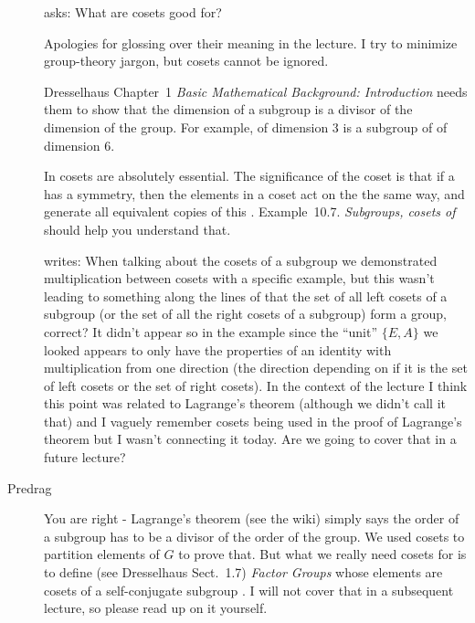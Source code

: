\begin{description}

  \item[\student]  asks:
    {What are cosets good for?}{
Apologies for glossing over their meaning in the lecture. I try to
minimize group-theory jargon, but cosets cannot be ignored.

Dresselhaus \etal{} 
Chapter~1 {\em Basic Mathematical Background: Introduction}
needs them to show that the dimension
of a subgroup is a divisor of the dimension of the group.
For example,  of dimension 3 is a subgroup
of  of dimension 6.

In
cosets are absolutely essential.
The significance of the coset is that if a {\lattstate} has a symmetry, then
the elements in a coset act on the {\lattstate} the same way, and generate
all equivalent copies of this {\lattstate}.
Example~10.7. {\em Subgroups, cosets of }
should help you understand that.
    }

  \item[\student] %
writes:
When talking about the cosets of a subgroup we demonstrated multiplication
between cosets with a specific example, but this wasn't leading to something
along the lines of that the set of all left cosets of a subgroup (or the set
of all the right cosets of a subgroup) form a group, correct? It didn't
appear so in the example since the ``unit''
\(
\{E,A\}
\)
we looked appears to only have the
properties of an identity with multiplication from one direction (the
direction depending on if it is the set of left cosets or the set of right
cosets). In the context of the lecture I think this point was related to
Lagrange's theorem (although we didn't call it that) and I vaguely remember
cosets being used in the proof of Lagrange's theorem but I wasn't connecting
it today. Are we going to cover that in a future lecture?

  \item[Predrag] %
You are right - Lagrange's theorem (see the
{wiki}) simply says the order of a subgroup has to be a divisor of the order
of the group. We used cosets to partition elements of $G$ to prove that. But
what we really need cosets for is to define (see Dresselhaus
\etal{} Sect.~1.7) {\em Factor Groups} whose elements are
cosets of a self-conjugate subgroup
. I will
not cover that in a subsequent lecture, so please read up on it yourself.


\end{description}
